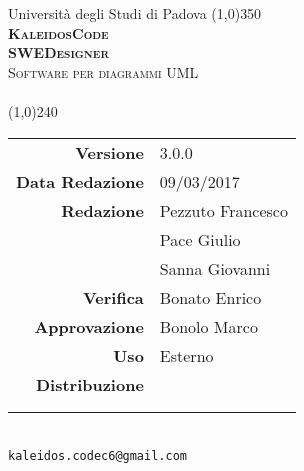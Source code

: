 \documentclass[a4paper,12pt]{article}
\author{KaleidosCode}
\date{09/03/2017}	%
\begin{document}
	\begin{titlepage}
		\centering Università degli Studi di Padova
		\line(1,0){350}\\
		\vspace{0.4cm}
		{\bfseries\scshape\LARGE KaleidosCode\\}
		\vspace{0.4cm}
		{\bfseries\scshape\LARGE SWEDesigner\\}
		{\scshape\Large Software per diagrammi UML\\}
		\vspace{1cm}
		{\scshape\Large \pianodiqualificai\ \\}		%
		\vspace{1.4cm}
		\logo
		\vspace{1.2cm}
		\line(1,0){240}\\
		\begin{tabular}{r|l}
			{\hfill \textbf{Versione}} 			& 3.0.0\\
			{\hfill \textbf{Data Redazione}} 	& 09/03/2017\\	%
			{\hfill \textbf{Redazione}} 		& Pezzuto Francesco\\& Pace Giulio\\ & Sanna Giovanni\\	%
			{\hfill \textbf{Verifica}} 			& Bonato Enrico\\	%
			{\hfill \textbf{Approvazione}} 		& Bonolo Marco\\	%
			{\hfill \textbf{Uso}} 				& Esterno\\
			{\hfill \textbf{Distribuzione}} 	& \vardanega \\ & \cardin \\ & \proponente\\
		\end{tabular}\\
		\vspace{2cm}
		\texttt{kaleidos.codec6@gmail.com}
	\end{titlepage}
	
	\pagestyle{myfront}
	\newpage
	
	\newpage
	\tableofcontents
	\newpage
	\listoftables
	\newpage
	\listoffigures
	\newpage
	\pagestyle{mymain}
	
	\newpage
	
	\newpage
	
	\newpage
	
	\appendix
	\newpage
	
	\newpage
	
	
	\label{LastPage}
\end{document}
